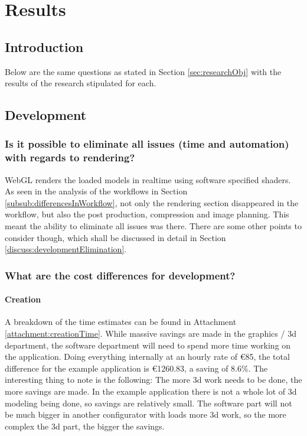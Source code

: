    
    
\chapter{Results}

\section{Introduction}
Below are the same questions as stated in Section \ref{sec:researchObj} with the results of the research stipulated for each.

\section{Development}

\subsection {Is it possible to eliminate all issues (time and automation) with regards to rendering?}
WebGL renders the loaded models in realtime using software specified shaders. As seen in the analysis of the workflows in Section \ref{subsub:differencesInWorkflow}, not only the rendering section disappeared in the workflow, but also the post production, compression and image planning. This meant the ability to eliminate all issues was there. There are some other points to consider though, which shall be discussed in detail in Section \ref{discuss:developmentElimination}.

\subsection{What are the cost differences for development?}
\subsubsection{Creation}
A breakdown of the time estimates can be found in Attachment \ref{attachment:creationTime}. While massive savings are made in the graphics / 3d department, the software department will need to spend more time working on the application. Doing everything internally at an hourly rate of €85, the total difference for the example application is €1260.83, a saving of 8.6\%. The interesting thing to note is the following: The more 3d work needs to be done, the more savings are made. In the example application there is not a whole lot of 3d modeling being done, so savings are relatively small. The software part will not be much bigger in another configurator with loads more 3d work, so the more complex the 3d part, the bigger the savings.

